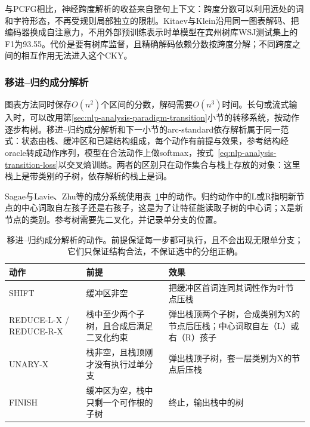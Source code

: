 与PCFG相比，神经跨度解析的收益来自整句上下文：跨度分数可以利用远处的词和字符形态，不再受规则局部独立的限制。Kitaev与Klein沿用同一图表解码、把编码器换成自注意力，不用外部预训练表示时单模型在宾州树库WSJ测试集上的F1为93.55。代价是要有树库监督，且精确解码依赖分数按跨度分解；不同跨度之间的相互作用无法进入这个CKY。

\subsubsection{移进--归约成分解析}
\label{sec:nlp-analysis-shift-reduce}

图表方法同时保存$O(n^2)$个区间的分数，解码需要$O(n^3)$时间。长句或流式输入时，可以改用第\ref{sec:nlp-analysis-paradigm-transition}小节的转移系统，按动作逐步构树。移进--归约成分解析和下一小节的arc-standard依存解析属于同一范式：状态由栈、缓冲区和已建结构组成，每个动作有前提与效果，参考结构经oracle转成动作序列，模型在合法动作上做softmax，按式~\eqref{eq:nlp-analysis-transition-loss}以交叉熵训练。两者的区别只在动作集合与栈上存放的对象：这里栈上是带类别的子树，依存解析的栈上是词。

Sagae与Lavie、Zhu等的成分系统使用表~\ref{tab:nlp-analysis-shift-reduce-actions}中的动作。归约动作中的L或R指明新节点的中心词取自左孩子还是右孩子，这是为了让特征能读取子树的中心词；X是新节点的类别。参考树需要先二叉化，并记录单分支的位置。

\begin{table}[htbp]
  \centering
  \begin{tabularx}{\linewidth}{@{}l X X@{}}
    \toprule
    动作&前提&效果\\
    \midrule
    SHIFT&缓冲区非空&把缓冲区首词连同其词性作为叶节点压栈\\
    REDUCE-L-X / REDUCE-R-X&栈中至少两个子树，且合成后满足二叉化约束&弹出栈顶两个子树，合成类别为X的节点后压栈；中心词取自左（L）或右（R）孩子\\
    UNARY-X&栈非空，且栈顶刚才没有执行过单分支&弹出栈顶子树，套一层类别为X的节点后压栈\\
    FINISH&缓冲区为空，栈中只剩一个可作根的子树&终止，输出栈中的树\\
    \bottomrule
  \end{tabularx}
  \caption{移进--归约成分解析的动作。前提保证每一步都可执行，且不会出现无限单分支；它们只保证结构合法，不保证选中的分组正确。}
  \label{tab:nlp-analysis-shift-reduce-actions}
\end{table}

